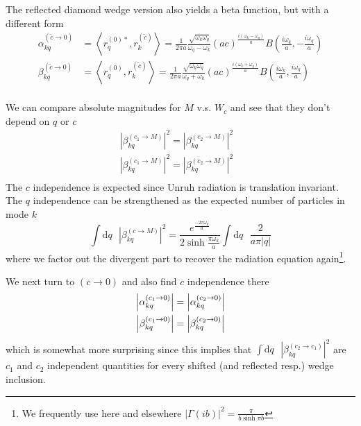\documentclass[12pt,a4paper]{article}
\newcommand{\dv}[1]{\mathrm{d} #1 \text{ }}
\begin{document}
The reflected diamond wedge version also yields a beta function, but with a different form
\begin{equation}
  \begin{aligned}
    \alpha^{(\widetilde{c} \rightarrow 0)}_{kq}     &= \left<r_q^{(0)*}, r_k^{(\widetilde{c})} \right> = \frac{1}{2 \pi a}\frac{\sqrt{\omega_k \omega_q}}{\omega_q - \omega_k} (ac)^{\frac{i(\omega_k - \omega_q)}{a}} B\left(\frac{i\omega_k}{a}, -\frac{i\omega_q}{a}\right) \\
    \beta^{(\widetilde{c} \rightarrow 0)}_{kq} &= \left<r_q^{(0)}, r_k^{(\widetilde{c})} \right> = \frac{1}{2 \pi a}\frac{\sqrt{\omega_k \omega_q}}{\omega_q + \omega_k} (ac)^{\frac{i(\omega_k + \omega_q)}{a}} B\left(\frac{i\omega_k}{a}, \frac{i\omega_q}{a}\right) \\
  \end{aligned}
  \label{bogoTC0}
\end{equation}


We can compare absolute magnitudes for $M$ v.s. $W_c$ and see that they don't depend on $q$ or $c$
\begin{equation}
  \begin{array}{cc}
    \left|\beta_{kq}^{(c_1 \rightarrow M)}\right|^2 = \left|\beta_{kq}^{(c_2 \rightarrow M)}\right|^2 & \\
    \left|\beta_{kq}^{(c_1 \rightarrow M)}\right|^2 = \left|\beta_{kq}^{(c_2 \rightarrow M)}\right|^2 & \\
 \end{array}
\end{equation}
The $c$ independence is expected since Unruh radiation is translation invariant. The $q$ independence can be strengthened as the expected number of particles in mode $k$
\begin{equation}
 \int \dv{q} \left|\beta_{kq}^{(c \rightarrow M)}\right|^2 = \frac{e^{\frac{-2 \pi \omega_k}{a}}}{2 \sinh \frac{\pi \omega_k}{a}} \int \dv{q} \frac{2}{a\pi |q|}
\end{equation}
where we factor out the divergent part to recover the radiation equation again\footnote{We frequently use here and elsewhere $|\Gamma(ib)|^2 = \frac{\pi}{b \sinh \pi b}$}.

We next turn to $(c \rightarrow 0)$ and also find $c$ independence there 
\begin{equation}
  \begin{array}{c}
    \left|\alpha_{kq}^{(c_1 \rightarrow 0)}\right| = \left|\alpha_{kq}^{(c_2 \rightarrow 0)}\right| \vspace{4pt} \\
    \left|\beta_{kq}^{(c_1 \rightarrow 0)}\right| = \left|\beta_{kq}^{(c_2 \rightarrow 0)}\right| \\
  \end{array}
\end{equation}
which is somewhat more surprising since this implies that $\int \dv{q} \left|\beta_{kq}^{(c_2 \rightarrow c_1)}\right|^2$ are $c_1$ and $c_2$ independent quantities for every shifted (and reflected resp.) wedge inclusion.
\end{document}
